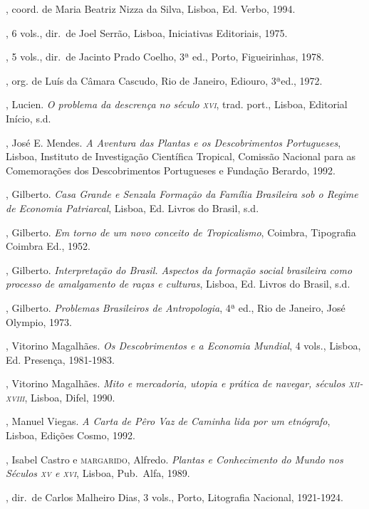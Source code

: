 \begin{bibliohedra}
, 
coord. de Maria Beatriz Nizza da Silva, Lisboa, Ed. Verbo, 1994.

, 6 vols., dir.~de Joel
Serrão, Lisboa, Iniciativas Editoriais, 1975.

, 5 vols., dir.~de Jacinto
Prado Coelho, 3ª ed., Porto, Figueirinhas, 1978.

, org. de Luís da Câmara
Cascudo, Rio de Janeiro, Ediouro, 3ªed., 1972. 

, Lucien. \textit{O problema da descrença no século \textsc{xvi}}, trad.
port., Lisboa, Editorial Início, s.d. 

, José E. Mendes. \textit{A Aventura das Plantas e os
Descobrimentos Portugueses}, Lisboa, Instituto de Investigação
Científica Tropical, Comissão Nacional para as Comemorações dos
Descobrimentos Portugueses e Fundação Berardo, 1992.

, Gilberto. \textit{Casa Grande e Senzala Formação da Família
Brasileira sob o Regime de Economia Patriarcal}, Lisboa, Ed. Livros do
Brasil, s.d.

, Gilberto. \textit{Em torno de um novo conceito de
Tropicalismo}, Coimbra, Tipografia Coimbra Ed., 1952.

, Gilberto. \textit{Interpretação do Brasil. Aspectos da
formação social brasileira como processo de amalgamento de raças e
culturas}, Lisboa, Ed. Livros do Brasil, s.d.

, Gilberto. \textit{Problemas Brasileiros de Antropologia}, 4ª
ed., Rio de Janeiro, José Olympio, 1973.

, Vitorino Magalhães. \textit{Os Descobrimentos e a Economia
Mundial}, 4 vols., Lisboa, Ed. Presença, 1981-1983.

, Vitorino Magalhães. \textit{Mito e mercadoria, utopia e
prática de navegar, séculos \textsc{xii}-\textsc{xviii}}, Lisboa, Difel, 1990.

, Manuel Viegas. \textit{A Carta de Pêro Vaz de Caminha lida
por um etnógrafo}, Lisboa, Edições Cosmo, 1992.

, Isabel Castro e \textsc{margarido}, Alfredo. \textit{Plantas e
Conhecimento do Mundo nos Séculos \textsc{xv} e \textsc{xvi}}, Lisboa, Pub.~Alfa, 1989.

, dir.~de Carlos
Malheiro Dias, 3 vols., Porto, Litografia Nacional, 1921-1924.


\end{bibliohedra}
